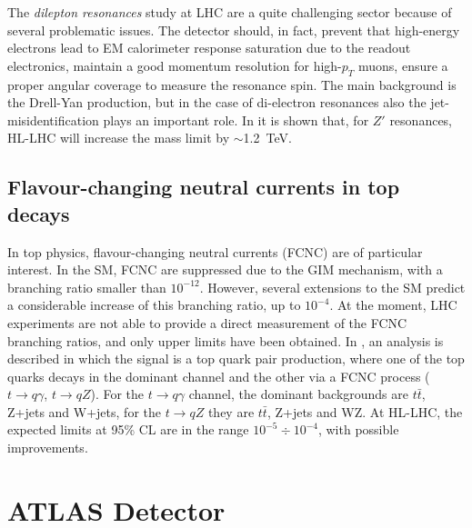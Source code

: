 \documentclass[a4paper,twoside,12pt]{book}
\begin{document}
The \textit{dilepton resonances} study at LHC are a quite challenging sector because of
several problematic issues. The detector should, in fact, prevent that high-energy electrons lead to EM calorimeter
response saturation due to the readout electronics, maintain a good momentum resolution for high-$p_T$ muons, ensure a proper angular coverage to measure the resonance spin. The main background is the Drell-Yan production, but in the 
case of di-electron resonances also the jet-misidentification plays an important role. In \cite{loi}
it is shown that, for $Z'$ resonances, HL-LHC will increase the mass limit by \mbox{$\sim$1.2 TeV}.

\section{Flavour-changing neutral currents in top decays}
In top physics, flavour-changing neutral currents (FCNC) are of particular interest.
In the SM, FCNC are suppressed due to the GIM mechanism, with a branching ratio smaller
than $10^{-12}$. However, several extensions to the SM predict a considerable increase of this branching ratio, up to $10^{-4}$. At the moment, LHC experiments are not able to provide a direct measurement of the FCNC branching ratios, and only upper limits have been obtained. 
In \cite{loi}, an analysis is described in which the signal is a top quark pair production, where
one of the top quarks decays in the dominant channel and the other via a FCNC process 
($t \rightarrow q\gamma$, $t \rightarrow qZ$). For the $t \rightarrow q\gamma$ channel, 
the dominant backgrounds are $t\bar{t}$, Z+jets and W+jets, for the $t \rightarrow qZ$ they are $t\bar{t}$, Z+jets and WZ. At HL-LHC, the expected limits at 95\% CL are in the range
$10^{-5} \div 10^{-4}$, with possible improvements. 

\clearpage

\chapter{ATLAS Detector} \label{sec:detector}
\end{document}
